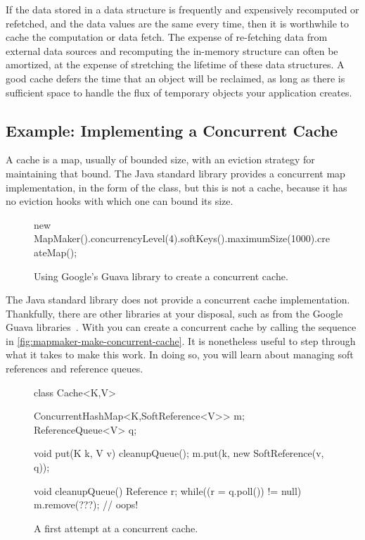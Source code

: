 If the data stored in a data structure is frequently and expensively recomputed
or refetched, and the data values are the same every time, then it is worthwhile
to cache the computation or data fetch. The expense of re-fetching data from
external data sources and recomputing the in-memory structure can often be
amortized, at the expense of stretching the lifetime of these data structures. A
good cache defers the time that an object will be reclaimed, as long as there is
sufficient space to handle the flux of temporary objects your application
creates.

\subsection{Example: Implementing a Concurrent Cache}
\label{sec:lifetime-management-concurrency-issues}

A cache is a map, usually of bounded size, with an eviction strategy for
maintaining that bound. The Java standard library provides a
concurrent map implementation, in the form of the 
class, but this is not a cache, because it has no eviction hooks with which one
can bound its size.

\begin{wrapfigure}[9]{r}{0.34\textwidth}
\centering
\begin{framedlisting}
new MapMaker().concurrencyLevel(4).softKeys().maximumSize(1000).createMap();
\end{framedlisting}
\caption{Using Google's Guava library to create a concurrent cache.}
\label{fig:mapmaker-make-concurrent-cache}
\end{wrapfigure}
The Java standard library does not provide a concurrent cache implementation.
Thankfully, there are other libraries at your disposal, such as 
from the Google Guava libraries~\cite{google-guava}. With  you can create
a concurrent cache by calling the sequence in
\autoref{fig:mapmaker-make-concurrent-cache}. It is nonetheless useful to step
through what it takes to make this work. In doing so, you will learn about
managing soft references and reference queues.

\begin{wrapfigure}{r}{0.61\textwidth}
\centering
\begin{figurelisting}
class Cache<K,V> {
  ConcurrentHashMap<K,SoftReference<V>> m;
  ReferenceQueue<V> q;
   
  void put(K k, V v) {
    cleanupQueue();
    m.put(k, new SoftReference(v, q));
  }
  
  void cleanupQueue() {
    Reference r;
    while((r = q.poll()) != null)
       m.remove(???); // oops!
  }
}
\end{figurelisting}
\caption{A first attempt at a concurrent cache.}
\label{fig:concurrent-cache-first-attempt}
\end{wrapfigure}

